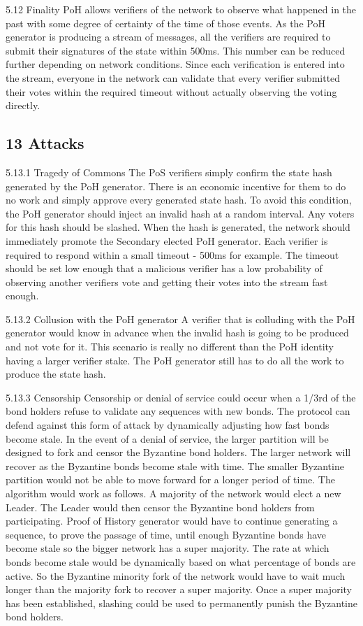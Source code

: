 \documentclass[11pt]{article}
\begin{document}
5.12 Finality PoH allows verifiers of the network to observe what happened in the past with some degree of certainty of the time of those events. As the PoH generator is producing a stream of messages, all the verifiers are required to submit their signatures of the state within 500ms. This number can be reduced further depending on network conditions. Since each verification is entered into the stream, everyone in the network can validate that every verifier submitted their votes within the required timeout without actually observing the voting directly.


\subsection{13 Attacks}

5.13.1 Tragedy of Commons The PoS verifiers simply confirm the state hash generated by the PoH generator. There is an economic incentive for them to do no work and simply approve every generated state hash. To avoid this condition, the PoH generator should inject an invalid hash at a random interval. Any voters for this hash should be slashed. When the hash is generated, the network should immediately promote the Secondary elected PoH generator. Each verifier is required to respond within a small timeout - 500ms for example. The timeout should be set low enough that a malicious verifier has a low probability of observing another verifiers vote and getting their votes into the stream fast enough.


5.13.2 Collusion with the PoH generator A verifier that is colluding with the PoH generator would know in advance when the invalid hash is going to be produced and not vote for it. This scenario is really no different than the PoH identity having a larger verifier stake. The PoH generator still has to do all the work to produce the state hash.


5.13.3 Censorship Censorship or denial of service could occur when a 1/3rd of the bond holders refuse to validate any sequences with new bonds. The protocol can defend against this form of attack by dynamically adjusting how fast bonds become stale. In the event of a denial of service, the larger partition will be designed to fork and censor the Byzantine bond holders. The larger network will recover as the Byzantine bonds become stale with time. The smaller Byzantine partition would not be able to move forward for a longer period of time. The algorithm would work as follows. A majority of the network would elect a new Leader. The Leader would then censor the Byzantine bond holders from participating. Proof of History generator would have to continue generating a sequence, to prove the passage of time, until enough Byzantine bonds have become stale so the bigger network has a super majority. The rate at which bonds become stale would be dynamically based on what percentage of bonds are active. So the Byzantine minority fork of the network would have to wait much longer than the majority fork to recover a super majority. Once a super majority has been established, slashing could be used to permanently punish the Byzantine bond holders.
\end{document}
